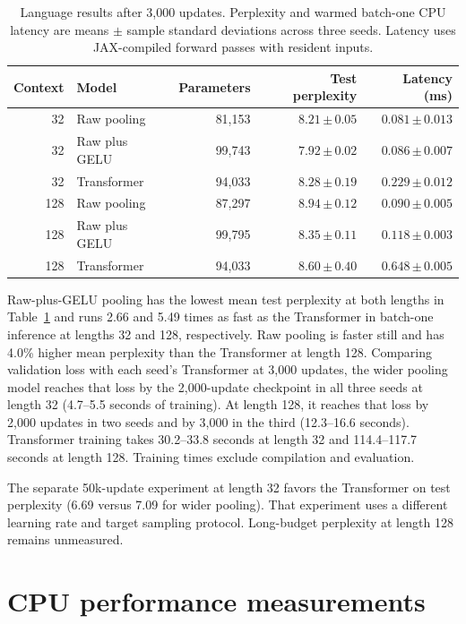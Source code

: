 \documentclass[11pt]{article}
\newcommand{\sd}[2]{#1\,{\scriptstyle\pm\,#2}}
\begin{document}
\begin{table}[htbp]
\centering\small
\caption{Language results after 3,000 updates. Perplexity and warmed batch-one CPU latency are means $\pm$ sample standard deviations across three seeds. Latency uses JAX-compiled forward passes with resident inputs.}
\label{tab:language-context}
\begin{tabular}{rlrrr}
\toprule
Context & Model & Parameters & Test perplexity & Latency (ms)\\
\midrule
32 & Raw pooling & 81,153 & \(\sd{8.21}{0.05}\) & \(\sd{0.081}{0.013}\)\\
32 & Raw plus GELU & 99,743 & \(\sd{7.92}{0.02}\) & \(\sd{0.086}{0.007}\)\\
32 & Transformer & 94,033 & \(\sd{8.28}{0.19}\) & \(\sd{0.229}{0.012}\)\\
\midrule
128 & Raw pooling & 87,297 & \(\sd{8.94}{0.12}\) & \(\sd{0.090}{0.005}\)\\
128 & Raw plus GELU & 99,795 & \(\sd{8.35}{0.11}\) & \(\sd{0.118}{0.003}\)\\
128 & Transformer & 94,033 & \(\sd{8.60}{0.40}\) & \(\sd{0.648}{0.005}\)\\
\bottomrule
\end{tabular}
\end{table}

Raw-plus-GELU pooling has the lowest mean test perplexity at both lengths in Table~\ref{tab:language-context} and runs 2.66 and 5.49 times as fast as the Transformer in batch-one inference at lengths 32 and 128, respectively. Raw pooling is faster still and has 4.0\% higher mean perplexity than the Transformer at length 128. Comparing validation loss with each seed's Transformer at 3,000 updates, the wider pooling model reaches that loss by the 2,000-update checkpoint in all three seeds at length 32 (4.7--5.5 seconds of training). At length 128, it reaches that loss by 2,000 updates in two seeds and by 3,000 in the third (12.3--16.6 seconds). Transformer training takes 30.2--33.8 seconds at length 32 and 114.4--117.7 seconds at length 128. Training times exclude compilation and evaluation.

The separate 50k-update experiment at length 32 favors the Transformer on test perplexity (6.69 versus 7.09 for wider pooling). That experiment uses a different learning rate and target sampling protocol. Long-budget perplexity at length 128 remains unmeasured.

\section{CPU performance measurements}
\end{document}
